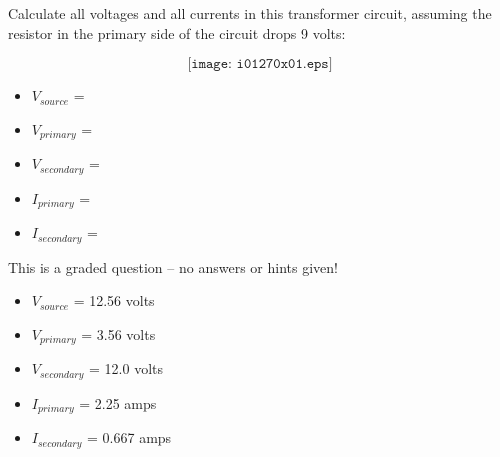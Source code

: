 

Calculate all voltages and all currents in this transformer circuit, assuming the resistor in the primary side of the circuit drops 9 volts:

$$\texttt{[image: i01270x01.eps]}$$

\begin{itemize}
\item{} $V_{source}$ = 
\item{} $V_{primary}$ = 
\item{} $V_{secondary}$ = 
\item{} $I_{primary}$ = 
\item{} $I_{secondary}$ = 
\end{itemize}

\vfil 

\eject






This is a graded question -- no answers or hints given!







\begin{itemize}
\item{} $V_{source}$ = 12.56 volts 
\item{} $V_{primary}$ = 3.56 volts
\item{} $V_{secondary}$ = 12.0 volts
\item{} $I_{primary}$ = 2.25 amps
\item{} $I_{secondary}$ = 0.667 amps
\end{itemize}




